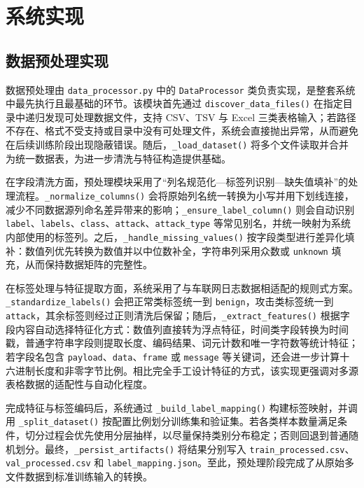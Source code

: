 \chapter{系统实现}
\label{cha:system-implementation}

\section{数据预处理实现}
\label{sec:implementation-preprocess}

数据预处理由 \texttt{data\_processor.py} 中的 \texttt{DataProcessor} 类负责实现，是整套系统中最先执行且最基础的环节。该模块首先通过 \texttt{discover\_data\_files()} 在指定目录中递归发现可处理数据文件，支持 CSV、TSV 与 Excel 三类表格输入；若路径不存在、格式不受支持或目录中没有可处理文件，系统会直接抛出异常，从而避免在后续训练阶段出现隐蔽错误。随后，\texttt{\_load\_dataset()} 将多个文件读取并合并为统一数据表，为进一步清洗与特征构造提供基础。

在字段清洗方面，预处理模块采用了“列名规范化—标签列识别—缺失值填补”的处理流程。\texttt{\_normalize\_columns()} 会将原始列名统一转换为小写并用下划线连接，减少不同数据源列命名差异带来的影响；\texttt{\_ensure\_label\_column()} 则会自动识别 \texttt{label}、\texttt{labels}、\texttt{class}、\texttt{attack}、\texttt{attack\_type} 等常见别名，并统一映射为系统内部使用的标签列。之后，\texttt{\_handle\_missing\_values()} 按字段类型进行差异化填补：数值列优先转换为数值并以中位数补全，字符串列采用众数或 \texttt{unknown} 填充，从而保持数据矩阵的完整性。

在标签处理与特征提取方面，系统采用了与车联网日志数据相适配的规则式方案。\texttt{\_standardize\_labels()} 会把正常类标签统一到 \texttt{benign}，攻击类标签统一到 \texttt{attack}，其余标签则经过正则清洗后保留；随后，\texttt{\_extract\_features()} 根据字段内容自动选择特征化方式：数值列直接转为浮点特征，时间类字段转换为时间戳，普通字符串字段则提取长度、编码结果、词元计数和唯一字符数等统计特征；若字段名包含 \texttt{payload}、\texttt{data}、\texttt{frame} 或 \texttt{message} 等关键词，还会进一步计算十六进制长度和非零字节比例。相比完全手工设计特征的方式，该实现更强调对多源表格数据的适配性与自动化程度。

完成特征与标签编码后，系统通过 \texttt{\_build\_label\_mapping()} 构建标签映射，并调用 \texttt{\_split\_dataset()} 按配置比例划分训练集和验证集。若各类样本数量满足条件，切分过程会优先使用分层抽样，以尽量保持类别分布稳定；否则回退到普通随机划分。最终，\texttt{\_persist\_artifacts()} 将结果分别写入 \texttt{train\_processed.csv}、\texttt{val\_processed.csv} 和 \texttt{label\_mapping.json}。至此，预处理阶段完成了从原始多文件数据到标准训练输入的转换。

